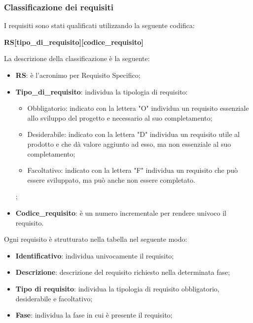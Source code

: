 \subsubsection{Classificazione dei requisiti}\label{2.2.3.1.5}%
I requisiti sono stati qualificati utilizzando la seguente codifica:
\begin{center}
	\textbf{RS[tipo\_di\_requisito][codice\_requisito]}
\end{center} 
La descrizione della classificazione è la seguente:
\begin{itemize}
	\item \textbf{RS}: è l'acronimo per Requisito Specifico;
	\item \textbf{Tipo\_di\_requisito}: individua la tipologia di requisito:
	\begin{itemize}
		\item Obbligatorio: indicato con la lettera "O" individua un requisito essenziale allo sviluppo del progetto e necessario al suo completamento;
		\item Desiderabile: indicato con la lettera "D" individua un requisito utile al prodotto e che dà valore aggiunto ad esso, ma non essenziale al suo completamento;
		\item Facoltativo: indicato con la lettera "F" individua un requisito che può essere sviluppato, ma può anche non essere completato.
	\end{itemize};
	\item \textbf{Codice\_requisito}: è un numero incrementale per rendere univoco il requisito.
\end{itemize}
Ogni requisito è strutturato nella tabella nel seguente modo:
\begin{itemize}
	\item \textbf{Identificativo}: individua univocamente il requisito;
	\item \textbf{Descrizione}: descrizione del requisito richiesto nella determinata fase;
	\item \textbf{Tipo di requisito}: individua la tipologia di requisito obbligatorio, desiderabile e facoltativo;
	\item \textbf{Fase}: individua la fase in cui è presente il requisito;
\end{itemize}

